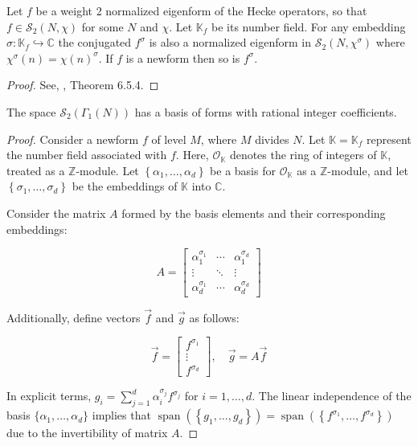 \begin{theorem}\label{newfrm}
   Let $f$ be a weight 2 normalized eigenform of the Hecke operators, so that $f \in \mathcal{S}_{2}(N, \chi)$ for some $N$ and $\chi$. Let $\mathbb{K}_{f}$ be its number field. For any embedding $\sigma: \mathbb{K}_{f} \hookrightarrow \mathbb{C}$ the conjugated $f^{\sigma}$ is also a normalized eigenform in $\mathcal{S}_{2}\left(N, \chi^{\sigma}\right)$ where $\chi^{\sigma}(n)=\chi(n)^{\sigma}$. If $f$ is a newform then so is $f^{\sigma}$.
 
\end{theorem}
\begin{proof}
    See, \cite{diamond2005first}, Theorem 6.5.4.
\end{proof}
\begin{corollary}
    The space $\mathcal{S}_{2}\left(\Gamma_{1}(N)\right)$ has a basis of forms with rational integer coefficients.

    \begin{proof}
        Consider a newform \(f\) of level \(M\), where \(M\) divides \(N\). Let \(\mathbb{K}=\mathbb{K}_{f}\) represent the number field associated with \(f\). Here, \(\mathcal{O}_{\mathbb{K}}\) denotes the ring of integers of \(\mathbb{K}\), treated as a \(\mathbb{Z}\)-module. Let \(\left\{\alpha_{1}, \ldots, \alpha_{d}\right\}\) be a basis for \(\mathcal{O}_{\mathbb{K}}\) as a \(\mathbb{Z}\)-module, and let \(\left\{\sigma_{1}, \ldots, \sigma_{d}\right\}\) be the embeddings of \(\mathbb{K}\) into \(\mathbb{C}\).

Consider the matrix \(A\) formed by the basis elements and their corresponding embeddings:

\[A=\left[\begin{array}{ccc}
\alpha_{1}^{\sigma_{1}} & \cdots & \alpha_{1}^{\sigma_{d}} \\
\vdots & \ddots & \vdots \\
\alpha_{d}^{\sigma_{1}} & \cdots & \alpha_{d}^{\sigma_{d}}
\end{array}\right]\]

Additionally, define vectors \(\vec{f}\) and \(\vec{g}\) as follows:

\[\vec{f}=\left[\begin{array}{c}
f^{\sigma_{1}} \\
\vdots \\
f^{\sigma_{d}}
\end{array}\right], \quad \vec{g}=A \vec{f}\]

In explicit terms, \(g_{i}=\sum_{j=1}^{d} \alpha_{i}^{\sigma_{j}} f^{\sigma_{j}}\) for \(i=1, \ldots, d\). The linear independence of the basis \(\{\alpha_{1}, \ldots, \alpha_{d}\}\) implies that \(\operatorname{span}\left(\left\{g_{1}, \ldots, g_{d}\right\}\right)=\operatorname{span}\left(\left\{f^{\sigma_{1}}, \ldots, f^{\sigma_{d}}\right\}\right)\) due to the invertibility of matrix \(A\).


\end{proof}
\end{corollary}
